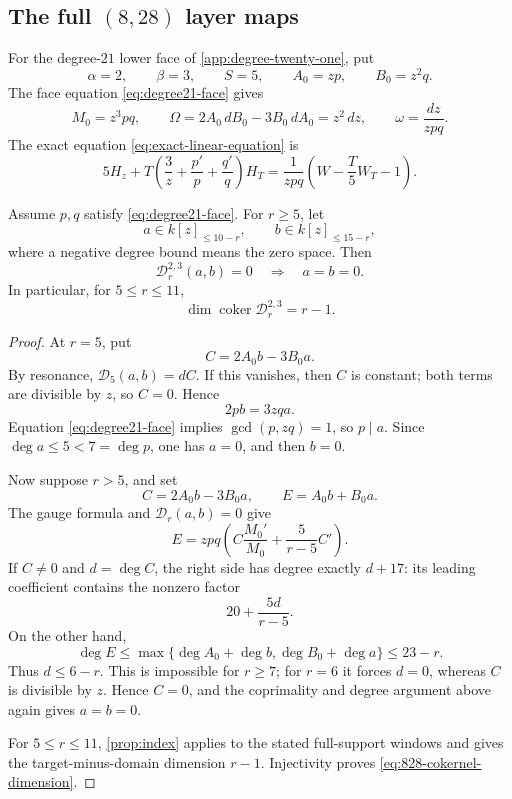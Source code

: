 \subsection{The full \texorpdfstring{\((8,28)\)}{(8,28)} layer maps}

For the degree-\(21\) lower face of
\cref{app:degree-twenty-one}, put
\[
\alpha=2,\qquad\beta=3,\qquad S=5,\qquad
A_0=zp,\qquad B_0=z^2q.
\]
The face equation \eqref{eq:degree21-face} gives
\[
M_0=z^3pq,\qquad
\Omega=2A_0\,dB_0-3B_0\,dA_0=z^2\,dz,
\qquad
\omega=\frac{dz}{zpq}.
\]
The exact equation \eqref{eq:exact-linear-equation} is
\begin{equation}
\label{eq:828-exact}
5H_z+
T\left(\frac3z+\frac{p'}p+\frac{q'}q\right)H_T
=
\frac1{zpq}\left(W-\frac T5W_T-1\right).
\end{equation}

\begin{proposition}
\label{prop:828-layer-injectivity}
Assume \(p,q\) satisfy \eqref{eq:degree21-face}.  For \(r\ge5\), let
\[
a\in k[z]_{\le10-r},\qquad
b\in k[z]_{\le15-r},
\]
where a negative degree bound means the zero space.  Then
\[
\mathscr D_r^{2,3}(a,b)=0
\quad\Longrightarrow\quad
a=b=0.
\]
In particular, for \(5\le r\le11\),
\begin{equation}
\label{eq:828-cokernel-dimension}
\dim\operatorname{coker}\mathscr D_r^{2,3}=r-1.
\end{equation}
\end{proposition}

\begin{proof}
At \(r=5\), put
\[
C=2A_0b-3B_0a.
\]
By resonance,
\(\mathscr D_5(a,b)=dC\).  If this vanishes, then \(C\) is constant; both
terms are divisible by \(z\), so \(C=0\).  Hence
\[
2pb=3zqa.
\]
Equation \eqref{eq:degree21-face} implies
\(\gcd(p,zq)=1\), so \(p\mid a\).  Since
\(\deg a\le5<7=\deg p\), one has \(a=0\), and then \(b=0\).

Now suppose \(r>5\), and set
\[
C=2A_0b-3B_0a,\qquad E=A_0b+B_0a.
\]
The gauge formula and \(\mathscr D_r(a,b)=0\) give
\begin{equation}
\label{eq:828-degree-identity}
E
=zpq\left(
C\frac{M_0'}{M_0}+\frac5{r-5}C'
\right).
\end{equation}
If \(C\ne0\) and \(d=\deg C\), the right side has degree exactly
\(d+17\): its leading coefficient contains the nonzero factor
\[
20+\frac{5d}{r-5}.
\]
On the other hand,
\[
\deg E\le
\max\{\deg A_0+\deg b,\deg B_0+\deg a\}
\le23-r.
\]
Thus \(d\le6-r\).  This is impossible for \(r\ge7\); for \(r=6\) it
forces \(d=0\), whereas \(C\) is divisible by \(z\).  Hence \(C=0\), and
the coprimality and degree argument above again gives \(a=b=0\).

For \(5\le r\le11\), \cref{prop:index} applies to the stated full-support
windows and gives the target-minus-domain dimension \(r-1\).
Injectivity proves \eqref{eq:828-cokernel-dimension}.
\end{proof}

